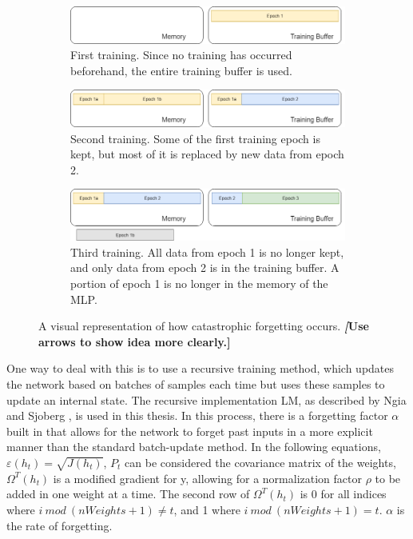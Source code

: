 	\begin{figure}[ht]
	\centering
	\begin{subfigure}{\linewidth}%
			\centering
			\includegraphics[width=\textwidth]{figures/CatastrophicForgettingA}
			\caption{First training. Since no training has occurred beforehand, the entire training buffer is used.}
	\end{subfigure}
	\begin{subfigure}{\linewidth}
		\centering
		\includegraphics[width=\textwidth]{figures/CatastrophicForgettingB}
		\caption{Second training. Some of the first training epoch is kept, but most of it is replaced by new data from epoch 2.}
	\end{subfigure}
	\begin{subfigure}{\linewidth}
	\centering
	\includegraphics[width=\textwidth]{figures/CatastrophicForgettingC}
	\caption{Third training. All data from epoch 1 is no longer kept, and only data from epoch 2 is in the training buffer. A portion of epoch 1 is no longer in the memory of the MLP.}
	\end{subfigure}%
	\caption{A visual representation of how catastrophic forgetting occurs. \textbf{\textit[Use arrows to show idea more clearly.]}}
	
	\end{figure}
	\par One way to deal with this is to use a recursive training method, which updates the network based on batches of samples each time but uses these samples to update an internal state. The recursive implementation LM, as described by Ngia and Sjoberg \cite{placeholderCitation}, is used in this thesis. In this process, there is a forgetting factor $\alpha$ built in that allows for the network to forget past inputs in a more explicit manner than the standard batch-update method. In the following equations, $\varepsilon(h_t) = \sqrt{J(h_t)}$, $P_t$ can be considered the covariance matrix of the weights, $\Omega^T(h_t)$ is a modified gradient for y, allowing for a normalization factor $\rho$ to be added in one weight at a time. The second row of $\Omega^T(h_t)$ is 0 for all indices where $i\ mod\ (nWeights+1) \neq t$, and 1 where $i\ mod\ (nWeights+1) = t$. $\alpha$ is the rate of forgetting. 
